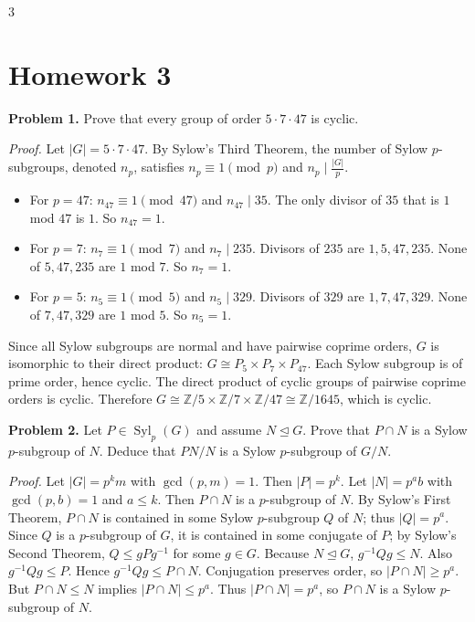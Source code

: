 \documentclass[10pt,landscape]{article}
\begin{document}
\begin{multicols}{3}





\section*{Homework 3}

\noindent\textbf{Problem 1.} Prove that every group of order \(5\cdot7\cdot47\) is cyclic.

\textit{Proof.} Let \(|G| = 5\cdot7\cdot47\). By Sylow's Third Theorem, the number of Sylow \(p\)-subgroups, denoted \(n_p\), satisfies \(n_p\equiv 1\pmod p\) and \(n_p\mid \frac{|G|}{p}\). 
\begin{itemize}
\item For \(p=47\): \(n_{47}\equiv1\pmod{47}\) and \(n_{47}\mid35\). The only divisor of \(35\) that is \(1\) mod \(47\) is \(1\). So \(n_{47}=1\).
\item For \(p=7\): \(n_7\equiv1\pmod7\) and \(n_7\mid235\). Divisors of \(235\) are \(1,5,47,235\). None of \(5,47,235\) are \(1\) mod \(7\). So \(n_7=1\).
\item For \(p=5\): \(n_5\equiv1\pmod5\) and \(n_5\mid329\). Divisors of \(329\) are \(1,7,47,329\). None of \(7,47,329\) are \(1\) mod \(5\). So \(n_5=1\).
\end{itemize}
Since all Sylow subgroups are normal and have pairwise coprime orders, \(G\) is isomorphic to their direct product: \(G\cong P_5\times P_7\times P_{47}\). Each Sylow subgroup is of prime order, hence cyclic. The direct product of cyclic groups of pairwise coprime orders is cyclic. Therefore \(G\cong\mathbb{Z}/5\times\mathbb{Z}/7\times\mathbb{Z}/47\cong\mathbb{Z}/1645\), which is cyclic.

\noindent\textbf{Problem 2.} Let \(P\in\operatorname{Syl}_p(G)\) and assume \(N\trianglelefteq G\). Prove that \(P\cap N\) is a Sylow \(p\)-subgroup of \(N\). Deduce that \(PN/N\) is a Sylow \(p\)-subgroup of \(G/N\).

\textit{Proof.} Let \(|G|=p^km\) with \(\gcd(p,m)=1\). Then \(|P|=p^k\). Let \(|N|=p^ab\) with \(\gcd(p,b)=1\) and \(a\le k\). Then \(P\cap N\) is a \(p\)-subgroup of \(N\). By Sylow's First Theorem, \(P\cap N\) is contained in some Sylow \(p\)-subgroup \(Q\) of \(N\); thus \(|Q|=p^a\). Since \(Q\) is a \(p\)-subgroup of \(G\), it is contained in some conjugate of \(P\); by Sylow's Second Theorem, \(Q\le gPg^{-1}\) for some \(g\in G\). Because \(N\trianglelefteq G\), \(g^{-1}Qg\le N\). Also \(g^{-1}Qg\le P\). Hence \(g^{-1}Qg\le P\cap N\). Conjugation preserves order, so \(|P\cap N|\ge p^a\). But \(P\cap N\le N\) implies \(|P\cap N|\le p^a\). Thus \(|P\cap N|=p^a\), so \(P\cap N\) is a Sylow \(p\)-subgroup of \(N\).


\end{multicols}
\end{document}

